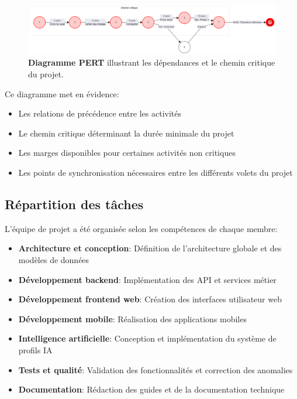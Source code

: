 \begin{figure}[H]
  \centering
  \includegraphics[width=1.0\textwidth,keepaspectratio]{pfe-pics/diagrames/Mermaid Chart - Create complex, visual diagrams with text. A smarter way of creating diagrams.-2025-06-10-203658.png}
  \caption{\textbf{Diagramme PERT} illustrant les dépendances et le chemin critique du projet.}
  \label{fig:pert_diagram}
\end{figure}

Ce diagramme met en évidence:

\begin{itemize}
  \item Les relations de précédence entre les activités
  
  \item Le chemin critique déterminant la durée minimale du projet
  
  \item Les marges disponibles pour certaines activités non critiques
  
  \item Les points de synchronisation nécessaires entre les différents volets du projet
\end{itemize}

\subsection{Répartition des tâches}

L'équipe de projet a été organisée selon les compétences de chaque membre:

\begin{itemize}
  \item \textbf{Architecture et conception}: Définition de l'architecture globale et des modèles de données
  
  \item \textbf{Développement backend}: Implémentation des API et services métier
  
  \item \textbf{Développement frontend web}: Création des interfaces utilisateur web
  
  \item \textbf{Développement mobile}: Réalisation des applications mobiles
  
  \item \textbf{Intelligence artificielle}: Conception et implémentation du système de profils IA
  
  \item \textbf{Tests et qualité}: Validation des fonctionnalités et correction des anomalies
  
  \item \textbf{Documentation}: Rédaction des guides et de la documentation technique
\end{itemize}

